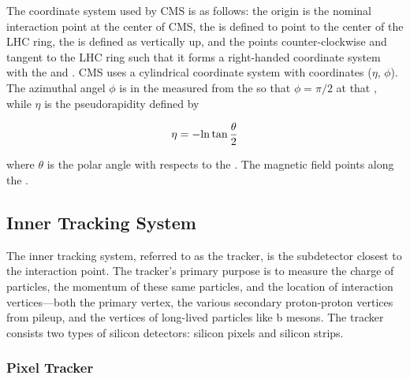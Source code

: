 The coordinate system used by CMS is as follows: the origin is the nominal
interaction point at the center of CMS, the \xaxis is defined to point to the
center of the LHC ring, the \yaxis is defined as vertically up, and the \zaxis
points counter-clockwise and tangent to the LHC ring such that it forms a
right-handed coordinate system with the \xaxis and \yaxis. CMS uses a
cylindrical coordinate system with coordinates ($\eta$, $\phi$). The azimuthal
angel $\phi$ is in the \xyplane measured from the \xaxis so that $\phi=\pi/2$
at that \xaxis, while $\eta$ is the pseudorapidity defined by

\begin{equation}
    \eta = -{\mathrm{ln}} \tan \frac{\theta}{2}
\end{equation}

where $\theta$ is the polar angle with respects to the \zaxis. The magnetic
field points along the \zaxis.

\subsection{Inner Tracking System}


The inner tracking system, referred to as the tracker, is the subdetector
closest to the interaction point. The tracker's primary purpose is to measure
the charge of particles, the momentum of these same particles, and the location
of interaction vertices---both the primary vertex, the various secondary
proton-proton vertices from pileup, and the vertices of long-lived particles
like b mesons. The tracker consists two types of silicon detectors: silicon
pixels and silicon strips.

\subsubsection{Pixel Tracker}

